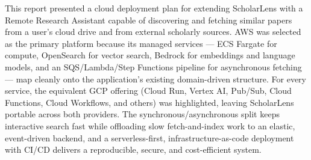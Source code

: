 \documentclass[12pt,a4paper]{article}
\begin{document}
This report presented a cloud deployment plan for extending ScholarLens with a
Remote Research Assistant capable of discovering and fetching similar papers
from a user's cloud drive and from external scholarly sources. AWS was selected
as the primary platform because its managed services --- ECS Fargate for
compute, OpenSearch for vector search, Bedrock for embeddings and language
models, and an SQS/Lambda/Step Functions pipeline for asynchronous fetching ---
map cleanly onto the application's existing domain-driven structure. For every
service, the equivalent GCP offering (Cloud Run, Vertex AI, Pub/Sub, Cloud
Functions, Cloud Workflows, and others) was highlighted, leaving ScholarLens
portable across both providers. The synchronous/asynchronous split keeps
interactive search fast while offloading slow fetch-and-index work to an
elastic, event-driven backend, and a serverless-first, infrastructure-as-code
deployment with CI/CD delivers a reproducible, secure, and cost-efficient
system.
\end{document}
